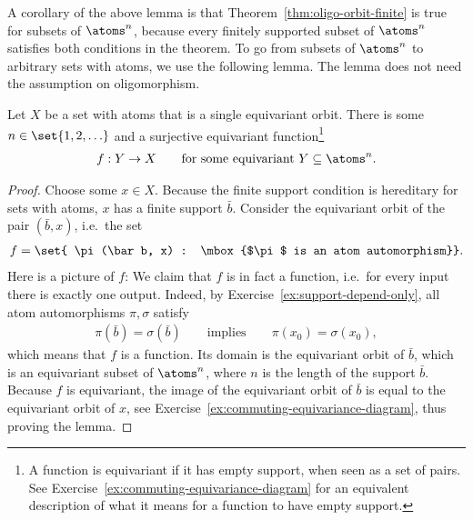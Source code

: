 A corollary of the above lemma is that Theorem~\ref{thm:oligo-orbit-finite} is true for subsets of $\atoms^n$, because every finitely supported subset of $\atoms^n$ satisfies both conditions in the theorem. To go from subsets of $\atoms^n$ to arbitrary sets with atoms, we use the following lemma. The lemma does not need the assumption on oligomorphism.


\begin{lemma}\label{lem:orbits-images-of-tuples} Let $X$ be a set with atoms that is a single equivariant orbit. There is some $n \in \set{1,2,\ldots}$ and a surjective equivariant function\footnote{A function is equivariant if it has empty support, when seen as a set of pairs. See Exercise~\ref{ex:commuting-equivariance-diagram} for an equivalent description of what it means for a function to have empty support.}
   \begin{align*}
	   f : Y \to X \qquad \text{for some equivariant $Y \subseteq \atoms^n$}.
   \end{align*} 
\end{lemma}
\begin{proof} 
   Choose some $x \in X$. Because the finite support condition is hereditary for sets with atoms, $x$ has a finite support $\bar b$. Consider the equivariant orbit of the pair $(\bar b, x)$, i.e.~the set
\begin{align*}
f = \set{ \pi(\bar b, x) : \mbox{$\pi$ is an atom automorphism}}.
\end{align*} Here is a picture of $f$:
We claim that $f$ is in fact a function, i.e.~for every input there is exactly one output. Indeed,
by Exercise~\ref{ex:support-depend-only}, all atom automorphisms $\pi,\sigma$ satisfy
\begin{align*}
   \pi(\bar b) = \sigma(\bar b) \qquad \text{implies} \qquad \pi(x_0) = \sigma(x_0),
\end{align*}
which means that $f$ is a function. Its domain is the equivariant orbit of $\bar b$, which is an equivariant subset of $\atoms^n$, where $n$ is the length of the support $\bar b$. Because $f$ is equivariant, the image of the equivariant orbit of $\bar b$ is equal to the equivariant orbit of $x$, see Exercise~\ref{ex:commuting-equivariance-diagram}, thus proving the lemma.
\end{proof}

